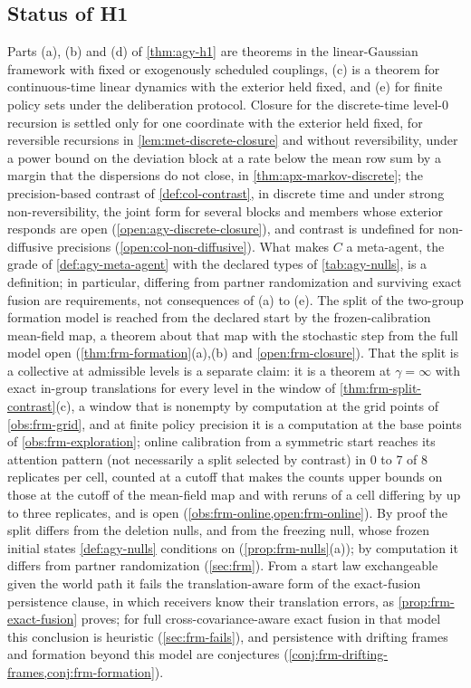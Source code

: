 \subsection{Status of H1}\label{sup:agy-status-of-h1}

\begin{remark}\label{rem:agy-h1-status}
Parts (a), (b) and (d) of \cref{thm:agy-h1} are theorems in the linear-Gaussian framework with fixed or exogenously scheduled couplings, (c) is a theorem for continuous-time linear dynamics with the exterior held fixed, and (e) for finite policy sets under the deliberation protocol. Closure for the discrete-time level-0 recursion is settled only for one coordinate with the exterior held fixed, for reversible recursions in \cref{lem:met-discrete-closure} and without reversibility, under a power bound on the deviation block at a rate below the mean row sum by a margin that the dispersions do not close, in \cref{thm:apx-markov-discrete}; the precision-based contrast of \cref{def:col-contrast}, in discrete time and under strong non-reversibility, the joint form for several blocks and members whose exterior responds are open (\cref{open:agy-discrete-closure}), and contrast is undefined for non-diffusive precisions (\cref{open:col-non-diffusive}). What makes $C$ a meta-agent, the grade of \cref{def:agy-meta-agent} with the declared types of \cref{tab:agy-nulls}, is a definition; in particular, differing from partner randomization and surviving exact fusion are requirements, not consequences of (a) to (e). The split of the two-group formation model is reached from the declared start by the frozen-calibration mean-field map, a theorem about that map with the stochastic step from the full model open (\cref{thm:frm-formation}(a),(b) and \cref{open:frm-closure}). That the split is a collective at admissible levels is a separate claim: it is a theorem at $\gamma=\infty$ with exact in-group translations for every level in the window of \cref{thm:frm-split-contrast}(c), a window that is nonempty by computation at the grid points of \cref{obs:frm-grid}, and at finite policy precision it is a computation at the base points of \cref{obs:frm-exploration}; online calibration from a symmetric start reaches its attention pattern (not necessarily a split selected by contrast) in 0 to 7 of 8 replicates per cell, counted at a cutoff that makes the counts upper bounds on those at the cutoff of the mean-field map and with reruns of a cell differing by up to three replicates, and is open (\cref{obs:frm-online,open:frm-online}). By proof the split differs from the deletion nulls, and from the freezing null, whose frozen initial states \cref{def:agy-nulls} conditions on (\cref{prop:frm-nulls}(a)); by computation it differs from partner randomization (\cref{sec:frm}). From a start law exchangeable given the world path it fails the translation-aware form of the exact-fusion persistence clause, in which receivers know their translation errors, as \cref{prop:frm-exact-fusion} proves; for full cross-covariance-aware exact fusion in that model this conclusion is heuristic (\cref{sec:frm-fails}), and persistence with drifting frames and formation beyond this model are conjectures (\cref{conj:frm-drifting-frames,conj:frm-formation}). 
\end{remark}
